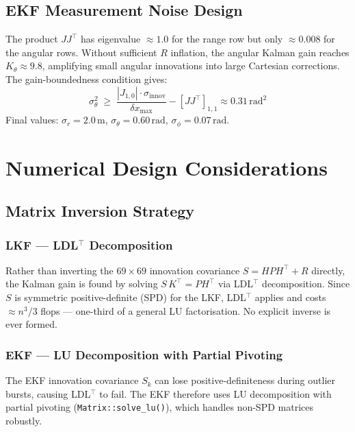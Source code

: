 \documentclass[11pt, a4paper]{article}
\begin{document}
\subsection{EKF Measurement Noise Design}
\label{sec:ekf_noise}

The product $JJ^\top$ has eigenvalue $\approx1.0$ for the range row but only
$\approx0.008$ for the angular rows. Without sufficient $R$ inflation, the angular
Kalman gain reaches $K_\theta\approx9.8$, amplifying small angular innovations into
large Cartesian corrections.
The gain-boundedness condition gives:
\begin{equation}
  \sigma_\theta^2 \;\ge\;
  \frac{|J_{1,0}|\cdot\sigma_\text{innov}}{\delta x_\text{max}}
  - [JJ^\top]_{1,1}
  \approx 0.31\,\text{rad}^2
\end{equation}
Final values: $\sigma_r = 2.0\,\text{m}$, $\sigma_\theta = 0.60\,\text{rad}$,
$\sigma_\phi = 0.07\,\text{rad}$.

\section{Numerical Design Considerations}

\subsection{Matrix Inversion Strategy}

\subsubsection{LKF --- LDL\texorpdfstring{$^\top$}{T} Decomposition}

Rather than inverting the $69\times69$ innovation covariance $S = HPH^\top + R$
directly, the Kalman gain is found by solving $S\,K^\top = PH^\top$ via
LDL$^\top$ decomposition. Since $S$ is symmetric positive-definite (SPD) for the
LKF, LDL$^\top$ applies and costs $\approx n^3/3$ flops --- one-third of a
general LU factorisation. No explicit inverse is ever formed.

\subsubsection{EKF --- LU Decomposition with Partial Pivoting}

The EKF innovation covariance $S_k$ can lose positive-definiteness during outlier
bursts, causing LDL$^\top$ to fail. The EKF therefore uses LU decomposition with
partial pivoting (\texttt{Matrix::solve\_lu()}), which handles non-SPD matrices
robustly.
\end{document}
